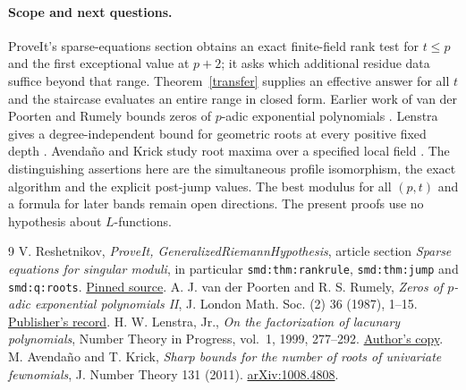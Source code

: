 \documentclass[11pt]{article}
\begin{document}
\paragraph{Scope and next questions.}
ProveIt's sparse-equations section obtains an exact finite-field rank test for $t\le p$ and the first exceptional value at $p+2$; it asks which additional residue data suffice beyond that range. Theorem~\ref{transfer} supplies an effective answer for all $t$ and the staircase evaluates an entire range in closed form. Earlier work of van der Poorten and Rumely bounds zeros of $p$-adic exponential polynomials \cite{vr}. Lenstra gives a degree-independent bound for geometric roots at every positive fixed depth \cite{len}. Avenda\~no and Krick study root maxima over a specified local field \cite{ak}. The distinguishing assertions here are the simultaneous profile isomorphism, the exact algorithm and the explicit post-jump values. The best modulus for all $(p,t)$ and a formula for later bands remain open directions. The present proofs use no hypothesis about $L$-functions.

\begin{thebibliography}{9}
 V. Reshetnikov, \emph{ProveIt, GeneralizedRiemannHypothesis}, article section \emph{Sparse equations for singular moduli}, in particular \texttt{smd:thm:rankrule}, \texttt{smd:thm:jump} and \texttt{smd:q:roots}. \href{https://github.com/VladimirReshetnikov/ProveIt/blob/41a284d6ef8eb16d783bfc685ab99cc6e1d28daa/Analysis/GeneralizedRiemannHypothesis/Article/sections/smd.tex}{Pinned source}.
 A. J. van der Poorten and R. S. Rumely, \emph{Zeros of $p$-adic exponential polynomials II}, J. London Math. Soc. (2) 36 (1987), 1--15. \href{https://doi.org/10.1112/jlms/s2-36.1.1}{Publisher's record}.
 H. W. Lenstra, Jr., \emph{On the factorization of lacunary polynomials}, Number Theory in Progress, vol.~1, 1999, 277--292. \href{https://pub.math.leidenuniv.nl/~lenstrahw/PUBLICATIONS/1999b/art.pdf}{Author's copy}.
 M. Avenda\~no and T. Krick, \emph{Sharp bounds for the number of roots of univariate fewnomials}, J. Number Theory 131 (2011). \href{https://arxiv.org/abs/1008.4808}{arXiv:1008.4808}.
\end{thebibliography}
\end{document}
